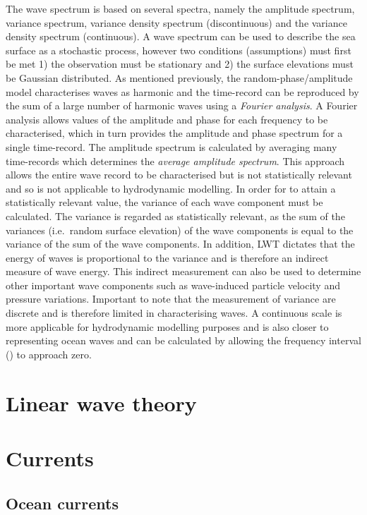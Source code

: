 \documentclass[
]{article}
\begin{document}
The wave spectrum is based on several spectra, namely the amplitude
spectrum, variance spectrum, variance density spectrum (discontinuous)
and the variance density spectrum (continuous). A wave spectrum can be
used to describe the sea surface as a stochastic process, however two
conditions (assumptions) must first be met 1) the observation must be
stationary and 2) the surface elevations must be Gaussian distributed.
As mentioned previously, the random-phase/amplitude model characterises
waves as harmonic and the time-record can be reproduced by the sum of a
large number of harmonic waves using a \emph{Fourier analysis}. A
Fourier analysis allows values of the amplitude and phase for each
frequency to be characterised, which in turn provides the amplitude and
phase spectrum for a single time-record. The amplitude spectrum is
calculated by averaging many time-records which determines the
\emph{average amplitude spectrum}. This approach allows the entire wave
record to be characterised but is not statistically relevant and so is
not applicable to hydrodynamic modelling. In order for to attain a
statistically relevant value, the variance of each wave component must
be calculated. The variance is regarded as statistically relevant, as
the sum of the variances (i.e.~random surface elevation) of the wave
components is equal to the variance of the sum of the wave components.
In addition, LWT dictates that the energy of waves is proportional to
the variance and is therefore an indirect measure of wave energy. This
indirect measurement can also be used to determine other important wave
components such as wave-induced particle velocity and pressure
variations. Important to note that the measurement of variance are
discrete and is therefore limited in characterising waves. A continuous
scale is more applicable for hydrodynamic modelling purposes and is also
closer to representing ocean waves and can be calculated by allowing the
frequency interval () to approach zero.

\hypertarget{linear-wave-theory}{%
\section{Linear wave theory}\label{linear-wave-theory}}

\hypertarget{currents}{%
\section{Currents}\label{currents}}

\hypertarget{ocean-currents}{%
\subsection{Ocean currents}\label{ocean-currents}}
\end{document}
